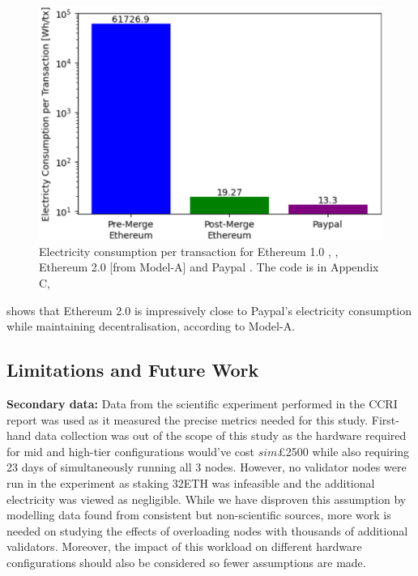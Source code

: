 \begin{figure}[!htb]
    \includegraphics[width=13cm,center]{Figures/PaypalEthElectrcityPlot.png}
    \caption{Electricity consumption per transaction for Ethereum 1.0 \cite{CCRIIndices}, \cite{EthereumBlockchair}, Ethereum 2.0 [from Model-A] and Paypal \cite{2007IntroductionPayPal}. The code is in Appendix C, }
    \label{Figure:PaypalEthElectrcityPlot}
\end{figure}

 shows that Ethereum 2.0 is impressively close to Paypal's electricity consumption while maintaining decentralisation, according to Model-A.



\subsection{Limitations and Future Work}
\label{LimitationsFutureWork}

\textbf{Secondary data:} Data from the scientific experiment performed in the CCRI report \cite{CryptoCarbonRatingsInstitute2022TheNetwork} was used as it measured the precise metrics needed for this study. First-hand data collection was out of the scope of this study as the hardware required for mid and high-tier configurations would've cost $sim$£2500 while also requiring 23 days of simultaneously running all 3 nodes. However, no validator nodes were run in the experiment as staking 32ETH was infeasible and the additional electricity was viewed as negligible. While we have disproven this assumption by modelling data found from consistent but non-scientific sources, more work is needed on studying the effects of overloading nodes with thousands of additional validators. Moreover, the impact of this workload on different hardware configurations should also be considered so fewer assumptions are made. 

